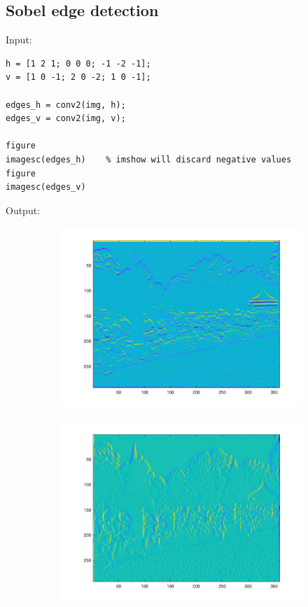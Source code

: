 \documentclass[12pt, a4paper]{article}
\begin{document}
\subsection{Sobel edge detection}
Input:
\begin{verbatim}
h = [1 2 1; 0 0 0; -1 -2 -1];
v = [1 0 -1; 2 0 -2; 1 0 -1];

edges_h = conv2(img, h);
edges_v = conv2(img, v);

figure
imagesc(edges_h)    % imshow will discard negative values
figure
imagesc(edges_v)
\end{verbatim}
Output:
\begin{figure}[H]
    \centering %
    \begin{subfigure}[b]{0.45\textwidth}
        \includegraphics[width=\textwidth]{fig2.png}
    \end{subfigure}
    \begin{subfigure}[b]{0.45\textwidth}
        \includegraphics[width=\textwidth]{fig3.png}
    \end{subfigure}
\end{figure}
\end{document}
